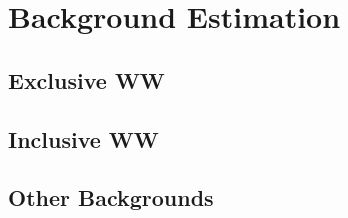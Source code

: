 \section{Background Estimation}
\label{sec:bkgEst}

\subsection{Exclusive WW}


\subsection{Inclusive WW}


\subsection{Other Backgrounds}
